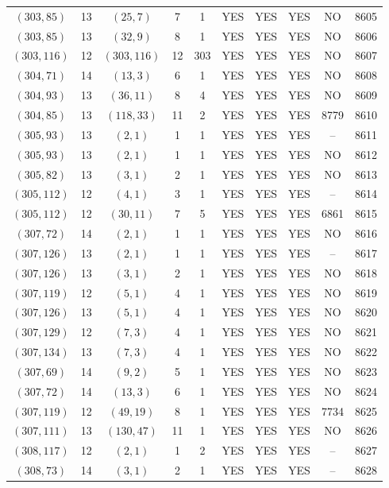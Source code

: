 \begin{longtable}{|c|c|c|c|c|c|c|c|c|c|}
$(303, 85)$ & 13 & $(25, 7)$ & 7 & 1 & YES & YES & YES & NO & 8605\\
$(303, 85)$ & 13 & $(32, 9)$ & 8 & 1 & YES & YES & YES & NO & 8606\\
$(303, 116)$ & 12 & $(303, 116)$ & 12 & 303 & YES & YES & YES & NO & 8607\\
$(304, 71)$ & 14 & $(13, 3)$ & 6 & 1 & YES & YES & YES & NO & 8608\\
$(304, 93)$ & 13 & $(36, 11)$ & 8 & 4 & YES & YES & YES & NO & 8609\\
$(304, 85)$ & 13 & $(118, 33)$ & 11 & 2 & YES & YES & YES & 8779 & 8610\\
$(305, 93)$ & 13 & $(2, 1)$ & 1 & 1 & YES & YES & YES & -- & 8611\\
$(305, 93)$ & 13 & $(2, 1)$ & 1 & 1 & YES & YES & YES & NO & 8612\\
$(305, 82)$ & 13 & $(3, 1)$ & 2 & 1 & YES & YES & YES & NO & 8613\\
$(305, 112)$ & 12 & $(4, 1)$ & 3 & 1 & YES & YES & YES & -- & 8614\\
$(305, 112)$ & 12 & $(30, 11)$ & 7 & 5 & YES & YES & YES & 6861 & 8615\\
$(307, 72)$ & 14 & $(2, 1)$ & 1 & 1 & YES & YES & YES & NO & 8616\\
$(307, 126)$ & 13 & $(2, 1)$ & 1 & 1 & YES & YES & YES & -- & 8617\\
$(307, 126)$ & 13 & $(3, 1)$ & 2 & 1 & YES & YES & YES & NO & 8618\\
$(307, 119)$ & 12 & $(5, 1)$ & 4 & 1 & YES & YES & YES & NO & 8619\\
$(307, 126)$ & 13 & $(5, 1)$ & 4 & 1 & YES & YES & YES & NO & 8620\\
$(307, 129)$ & 12 & $(7, 3)$ & 4 & 1 & YES & YES & YES & NO & 8621\\
$(307, 134)$ & 13 & $(7, 3)$ & 4 & 1 & YES & YES & YES & NO & 8622\\
$(307, 69)$ & 14 & $(9, 2)$ & 5 & 1 & YES & YES & YES & NO & 8623\\
$(307, 72)$ & 14 & $(13, 3)$ & 6 & 1 & YES & YES & YES & NO & 8624\\
$(307, 119)$ & 12 & $(49, 19)$ & 8 & 1 & YES & YES & YES & 7734 & 8625\\
$(307, 111)$ & 13 & $(130, 47)$ & 11 & 1 & YES & YES & YES & NO & 8626\\
$(308, 117)$ & 12 & $(2, 1)$ & 1 & 2 & YES & YES & YES & -- & 8627\\
$(308, 73)$ & 14 & $(3, 1)$ & 2 & 1 & YES & YES & YES & -- & 8628\\

\end{longtable}
